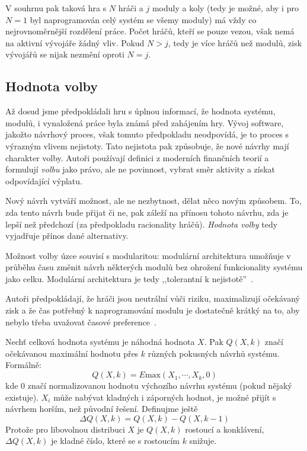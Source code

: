 \begin{multicols}{2}
		V souhrnu pak taková hra s $N$ hráči a $j$ moduly a koly (tedy je možné, aby i pro $N =1$ byl naprogramován celý systém se všemy moduly) má vždy co nejrovnoměrnější rozdělení práce. Počet hráčů, kteří se pouze vezou, však nemá na aktivní vývojáře žádný vliv. Pokud $N > j$, tedy je více hráčů než modulů, zisk vývojářů se nijak nezmění oproti $N = j$.

	\subsection*{Hodnota volby}
		Až dosud jsme předpokládali hru s úplnou informací, že hodnota systému, modulů, i vynaložená práce byla známá před zahájením hry. Vývoj software, jakožto návrhový proces, však tomuto předpokladu neodpovídá, je to proces s výrazným vlivem nejistoty. Tato nejistota pak způsobuje, že nové návrhy mají charakter volby. Autoři používají definici z moderních finančních teorií a formulují {\em volbu} jako právo, ale ne povinnost, vybrat směr aktivity a získat odpovídající výplatu.

		Nový návrh vytváří možnost, ale ne nezbytnost, dělat něco novým způsobem. To, zda tento návrh bude přijat či ne, pak záleží na přínosu tohoto návrhu, zda je lepší než předchozí (za předpokladu racionality hráčů). {\em Hodnota volby} tedy vyjadřuje přínos dané alternativy.

		Možnost volby úzce souvisí s modularitou: modulární architektura umožňuje v průběhu času změnit návrh některých modulů bez ohrožení funkcionality systému jako celku. Modulární architektura je tedy ,,tolerantní k nejistotě''~\cite[kap. 2.2]{architecture-opensource}.

		Autoři předpokládají, že hráči jsou neutrální vůči riziku, maximalizují očekávaný zisk a že čas potřebný k naprogramování modulu je dostatečně krátký na to, aby nebylo třeba uvažovat časové preference~\cite[kap. 5]{architecture-opensource}.

		Nechť celková hodnota systému je náhodná hodnota $X$. Pak $Q(X, k)$ značí očekávanou maximální hodnotu přes $k$ různých pokusných návrhů systému. Formálně:
		$$Q(X, k) = E\text{max}(X_1, \cdots, X_k, 0)$$
		kde $0$ značí normalizovanou hodnotu výchozího návrhu systému (pokud nějaký existuje). $X_i$ může nabývat kladných i záporných hodnot, je možné přijít s návrhem horším, než původní řešení. Definujme ještě
		$$\Delta Q(X, k) = Q(X,k) - Q(X, k-1)$$
		Protože pro libovolnou distribuci $X$ je $Q(X,k)$ rostoucí a konklávení, $\Delta Q(X,k)$ je kladné číslo, které se s rostoucím $k$ snižuje.


\end{multicols}
